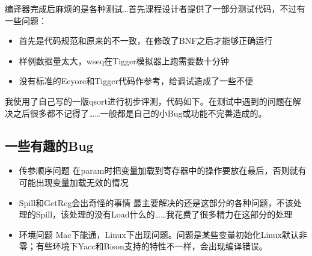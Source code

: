 \documentclass{ctexart}
\begin{document}
编译器完成后麻烦的是各种测试…首先课程设计者提供了一部分测试代码，不过有一些问题：

\begin{itemize}
  \item 首先是代码规范和原来的不一致，在修改了BNF之后才能够正确运行
  \item 样例数据量太大，wseq在Tigger模拟器上跑需要数十分钟
  \item 没有标准的Eeyore和Tigger代码作参考，给调试造成了一些不便
\end{itemize}

我使用了自己写的一版qsort进行初步评测，代码如下。在测试中遇到的问题在解决之后很多都不记得了……一般都是自己的小Bug或功能不完善造成的。

\subsection{一些有趣的Bug}
\begin{itemize}
  \item 传参顺序问题
  在param时把变量加载到寄存器中的操作要放在最后，否则就有可能出现变量加载无效的情况
  \item Spill和GetReg会出奇怪的事情
  最主要解决的还是这部分的各种问题，不该处理的Spill，该处理的没有Load什么的……我花费了很多精力在这部分的处理
  \item 环境问题
  Mac下能通，Linux下出现问题。问题是某些变量初始化Linux默认非零；有些环境下Yacc和Bison支持的特性不一样，会出现编译错误。
\end{itemize}
\end{document}
